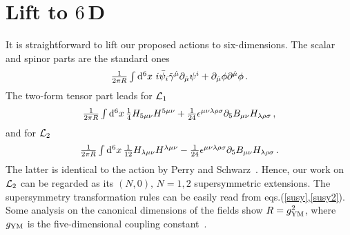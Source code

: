\documentclass[a4paper,12pt]{article}
\def\L{{\cal L}}
\begin{document}
\section{Lift to $6\,$D\label{lift}}
It is straightforward to lift our proposed actions to six-dimensions. The scalar and spinor parts are the standard ones 
\begin{equation}
\textstyle{\frac{1}{2\pi R}}\int {\rm d}^{6}x\,\,i\bar{\psi}_{i}\tilde{\gamma}^{\hat{\mu}}\partial_{\hat{\mu}}
\psi^{i}+\partial_{\hat{\mu}}\phi\partial^{\hat{\mu}}\phi\,.
\end{equation}
The two-form tensor part leads  for $\L_{1}$
\begin{equation}
\textstyle{\frac{1}{2\pi R}}\int {\rm d}^{6}x\,\textstyle{\frac{1}{4}}H_{5\mu\nu}H^{5\mu\nu}+\textstyle{\frac{1}{24}}\epsilon^{\mu\nu\lambda\rho\sigma}\partial_{5}B_{\mu\nu}H_{\lambda\rho\sigma}\,,
\label{B2}
\end{equation}
and for $\L_{2}$
\begin{equation}
\textstyle{\frac{1}{2\pi R}}\int {\rm d}^{6}x\,\textstyle{\frac{1}{12}}H_{\lambda\mu\nu}H^{\lambda\mu\nu}-\textstyle{\frac{1}{24}}\epsilon^{\mu\nu\lambda\rho\sigma}\partial_{5}B_{\mu\nu}H_{\lambda\rho\sigma}\,.
\label{pesc}
\end{equation}
The latter is identical to the action  by Perry and Schwarz~\cite{9611065}.  Hence, our work on $\L_{2}$ can be regarded as  
its  $(N,0),\,N=1,2$ supersymmetric extensions. The supersymmetry transformation rules  can be easily read from eqs.(\ref{susy},\ref{susy2}).  Some analysis on the canonical dimensions of the fields show $R=g_{{\rm YM}}^{2}$, where $g_{{\rm YM}}$ is the five-dimensional coupling constant~\cite{seiberg16,0004195}.\newline 
\end{document}
